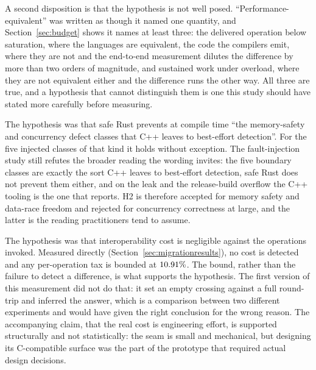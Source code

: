 \documentclass[english,twoside,openright,a4paper,censored,csm,software-track-2020]{HYthesisML}
\begin{document}
\begin{description}
        A second disposition is that the hypothesis is not well posed.
        ``Performance-equivalent'' was written as though it named one quantity, and
        Section~\ref{sec:budget} shows it names at least three: the delivered operation below
        saturation, where the languages are equivalent, the code the compilers emit, where they
        are not and the end-to-end measurement dilutes the difference by more than two orders of
        magnitude, and sustained work under overload, where they are not equivalent either and
        the difference runs the other way. All three are true, and a hypothesis that cannot
        distinguish them is one this study should have stated more carefully before measuring.
  \item[H2: supported in its precise form, refuted in its loose one.] The hypothesis was
        that safe Rust prevents at compile time ``the memory-safety and concurrency defect
        classes that C++ leaves to best-effort detection''. For the five injected classes of
        that kind it holds without exception. The fault-injection study still refutes
        the broader reading the wording invites: the five boundary classes are exactly the sort
        C++ leaves to best-effort detection, safe Rust does not prevent them either, and on the
        leak and the release-build overflow the C++ tooling is the one that reports. H2 is
        therefore accepted for memory safety and
        data-race freedom and rejected for concurrency correctness at large, and the latter is
        the reading practitioners tend to assume.
  \item[H3: supported, and tested the right way on the second attempt.] The hypothesis was
        that interoperability cost is negligible against the operations invoked. Measured
        directly (Section~\ref{sec:migrationresults}), no cost is detected and any per-operation
        tax is bounded at $10.91\%$. The bound, rather than the failure to detect a
        difference, is what supports the hypothesis. The first version of this measurement did
        not do that: it set an empty crossing against a full round-trip and inferred the
        answer, which is a comparison between two different experiments and would have given
        the right conclusion for the wrong reason. The accompanying claim, that the real cost
        is engineering effort, is supported structurally and not statistically: the seam is
        small and mechanical, but designing its C-compatible surface was the part of the
        prototype that required actual design decisions.
\end{description}
\end{document}
